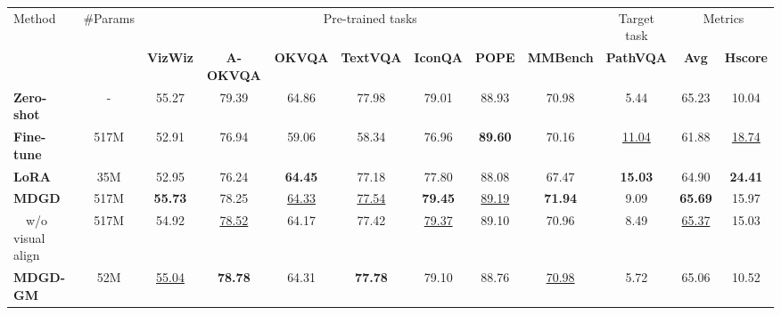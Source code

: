 \begin{table*}[ht]
  \centering
  \small
  \begin{tabular}{lccccccccccc}
    \toprule   
    \multirow{2}{*}{Method} & \multirow{2}{*}{\#Params} & \multicolumn{7}{c}{Pre-trained tasks} & \multicolumn{1}{c}{Target task} & \multicolumn{2}{c}{Metrics} \\
    \cmidrule(lr){3-9} \cmidrule(lr){10-10} \cmidrule(lr){11-12}
    &                       & \textbf{VizWiz} & \textbf{A-OKVQA} & \textbf{OKVQA} & \textbf{TextVQA} & \textbf{IconQA} & \textbf{POPE} & \textbf{MMBench} & \textbf{PathVQA} & \textbf{Avg} & \textbf{Hscore} \\
    \midrule
    \textbf{Zero-shot}       & -     & 55.27  & 79.39 & 64.86 & 77.98 & 79.01 & 88.93 & 70.98 & 5.44 & 65.23   & 10.04\\
    \midrule
    \textbf{Fine-tune}       & 517M  & 52.91  & 76.94 & 59.06 & 58.34 & 76.96 & \textbf{89.60} & 70.16 & \underline{11.04} & 61.88  & \underline{18.74}\\
    \textbf{LoRA}            & 35M & 52.95  & 76.24 & \textbf{64.45} & 77.18 & 77.80 & 88.08 & 67.47 & \textbf{15.03} & 64.90 & \textbf{24.41}\\
    \midrule
    \textbf{MDGD}           &  517M  & \textbf{55.73}  & 78.25 & \underline{64.33} & \underline{77.54} & \textbf{79.45} & \underline{89.19} & \textbf{71.94} & 9.09 & \textbf{65.69}   & 15.97\\
    ~~w/o visual align & 517M  & 54.92  & \underline{78.52} & 64.17 & 77.42 & \underline{79.37} & 89.10 & 70.96 & 8.49 & \underline{65.37}  & 15.03\\
   \textbf{ MDGD-GM}  & 52M  & \underline{55.04}  & \textbf{78.78} & 64.31 & \textbf{77.78} & 79.10 & 88.76 & \underline{70.98} & 5.72 & 65.06  & 10.52 \\
    
    \bottomrule
    \toprule
    

\end{tabular}
\end{table*}

